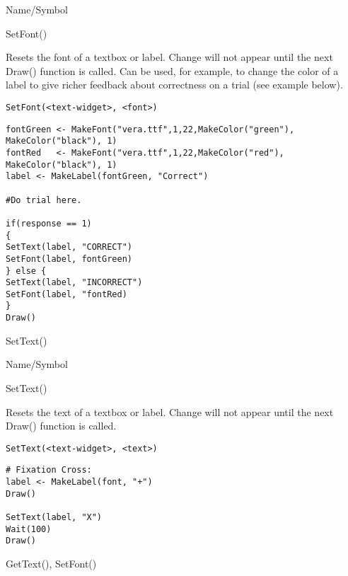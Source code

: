 \begin{desc}{Name/Symbol}
\item[Name/Symbol] 	SetFont()

\item[Description] 	Resets the font of a textbox or label.  Change will not appear 
		until the next Draw() function is called.  Can be used, for 
		example, to change the color of a label to give richer 
		feedback about correctness on a trial (see example below).

\item[Usage]
\begin{verbatim}
SetFont(<text-widget>, <font>)
\end{verbatim}

\item[Example]   	
\begin{verbatim}
fontGreen <- MakeFont("vera.ttf",1,22,MakeColor("green"),
MakeColor("black"), 1)
fontRed   <- MakeFont("vera.ttf",1,22,MakeColor("red"),
MakeColor("black"), 1)
label <- MakeLabel(fontGreen, "Correct")

#Do trial here.       	

if(response == 1)
{
SetText(label, "CORRECT")
SetFont(label, fontGreen)
} else {
SetText(label, "INCORRECT")
SetFont(label, "fontRed)
}
Draw()
\end{verbatim}

\item[See Also]    	SetText()
\end{desc}

\rl


\begin{desc}{Name/Symbol}

\item[Name/Symbol] 	SetText()

\item[Description] 	Resets the text of a textbox or label.  Change will not
		appear until the next Draw() function is called.

\item[Usage]
\begin{verbatim}
SetText(<text-widget>, <text>)
\end{verbatim}

\item[Example]
\begin{verbatim}
# Fixation Cross:
label <- MakeLabel(font, "+")
Draw()

SetText(label, "X")
Wait(100)
Draw()
\end{verbatim}

\item[See Also]    	GetText(), SetFont()
\end{desc}

